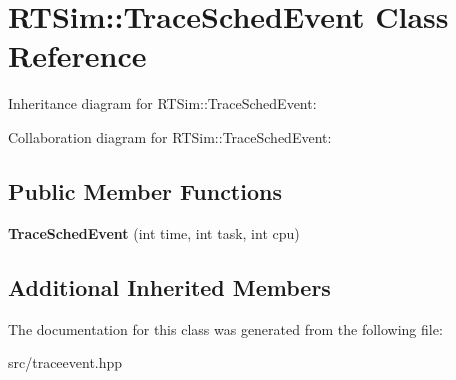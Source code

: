 \hypertarget{classRTSim_1_1TraceSchedEvent}{}\section{R\+T\+Sim\+:\+:Trace\+Sched\+Event Class Reference}
\label{classRTSim_1_1TraceSchedEvent}


Inheritance diagram for R\+T\+Sim\+:\+:Trace\+Sched\+Event\+:


Collaboration diagram for R\+T\+Sim\+:\+:Trace\+Sched\+Event\+:
\subsection*{Public Member Functions}
\begin{DoxyCompactItemize}
\item 
{\bfseries Trace\+Sched\+Event} (int time, int task, int cpu)\hypertarget{classRTSim_1_1TraceSchedEvent_abd92af6a43e2d0e630e06bef82ff1e5f}{}\label{classRTSim_1_1TraceSchedEvent_abd92af6a43e2d0e630e06bef82ff1e5f}

\end{DoxyCompactItemize}
\subsection*{Additional Inherited Members}


The documentation for this class was generated from the following file\+:\begin{DoxyCompactItemize}
\item 
src/traceevent.\+hpp\end{DoxyCompactItemize}
